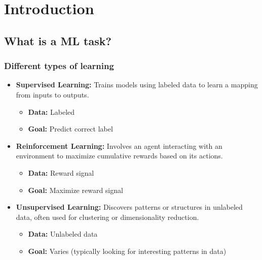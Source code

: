 \section{Introduction}
    \subsection{What is a ML task?}
        \subsubsection{Different types of learning}
            \begin{definition}
                \begin{itemize}
                    \item \textbf{Supervised Learning:} Trains models using labeled data to learn a mapping from inputs to outputs.
                    \begin{itemize}
                        \item \textbf{Data:} Labeled
                        \item \textbf{Goal:} Predict correct label
                    \end{itemize}
                    \item \textbf{Reinforcement Learning:} Involves an agent interacting with an environment to maximize cumulative rewards based on its actions.
                    \begin{itemize}
                        \item \textbf{Data:} Reward signal
                        \item \textbf{Goal:} Maximize reward signal
                    \end{itemize}
                    \item \textbf{Unsupervised Learning:} Discovers patterns or structures in unlabeled data, often used for clustering or dimensionality reduction.
                    \begin{itemize}
                        \item \textbf{Data:} Unlabeled data
                        \item \textbf{Goal:} Varies (typically looking for interesting patterns in data)
                    \end{itemize}
                \end{itemize}            
            \end{definition}
